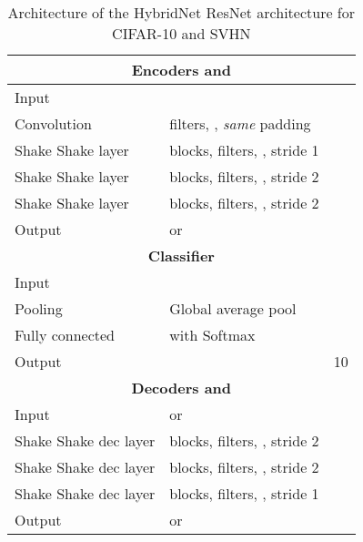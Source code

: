 \documentclass[runningheads]{llncs}
\begin{document}
 \begin{table}[htbp]
\centering
\caption{Architecture of the HybridNet ResNet architecture for CIFAR-10 and SVHN}
\label{tab:resnet}
\begin{threeparttable}
\setlength{\tabcolsep}{4pt}
\begin{tabular}{ l l l}
\toprule
\multicolumn{3}{c}{\textbf{Encoders  and }} \\
\midrule
Input &  &  \\
Convolution &  filters, , \textit{same} padding &  \\

Shake Shake layer &  blocks,  filters, ,  stride 1 &  \\
Shake Shake layer &  blocks,  filters, ,  stride 2 &  \\
Shake Shake layer &  blocks,  filters, ,  stride 2 &  \\
Output &  or  &  \\

\toprule
\multicolumn{3}{c}{\textbf{Classifier }}\\
\midrule
Input & &  \\
Pooling & Global average pool &  \\
Fully connected & with Softmax &  \\
Output &  & 10 \\
\toprule
\multicolumn{3}{c}{\textbf{Decoders  and }}\\
\midrule
Input &  or  &  \\
Shake Shake dec layer &  blocks,  filters, ,  stride 2 &  \\
Shake Shake dec layer &  blocks,  filters, ,  stride 2 &  \\
Shake Shake dec layer &  blocks,  filters, ,  stride 1 &  \\
Output &  or  &  \\
\bottomrule
\end{tabular}
\begin{tablenotes}
\end{tablenotes}
\end{threeparttable}
\end{table}
\end{document}
